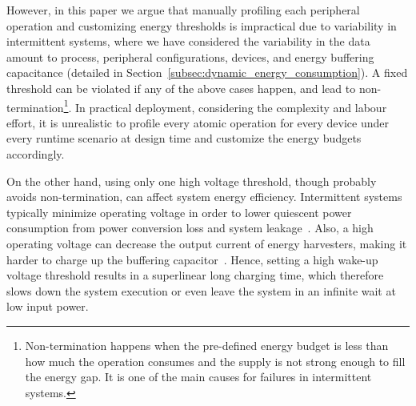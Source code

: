 
However, in this paper we argue that manually profiling each peripheral operation and customizing energy thresholds is impractical due to variability in intermittent systems, where we have considered the variability in the data amount to process, peripheral configurations, devices, and energy buffering capacitance (detailed in Section~\ref{subsec:dynamic_energy_consumption}). 
A fixed threshold can be violated if any of the above cases happen, and lead to non-termination\footnote{Non-termination happens when the pre-defined energy budget is less than how much the operation consumes and the supply is not strong enough to fill the energy gap. It is one of the main causes for failures in intermittent systems. }.
In practical deployment, considering the complexity and labour effort, it is unrealistic to profile every atomic operation for every device under every runtime scenario at design time and customize the energy budgets accordingly. 




On the other hand, using only one high voltage threshold, though probably avoids non-termination, can affect system energy efficiency. 
Intermittent systems typically minimize operating voltage in order to lower quiescent power consumption from power conversion loss and system leakage~\cite{gomez2016dynamic}. 
Also, a high operating voltage can decrease the output current of energy harvesters, making it harder to charge up the buffering capacitor~\cite{pan2017maximize}.
Hence, setting a high wake-up voltage threshold results in a superlinear long charging time, which therefore slows down the system execution or even leave the system in an infinite wait at low input power.



